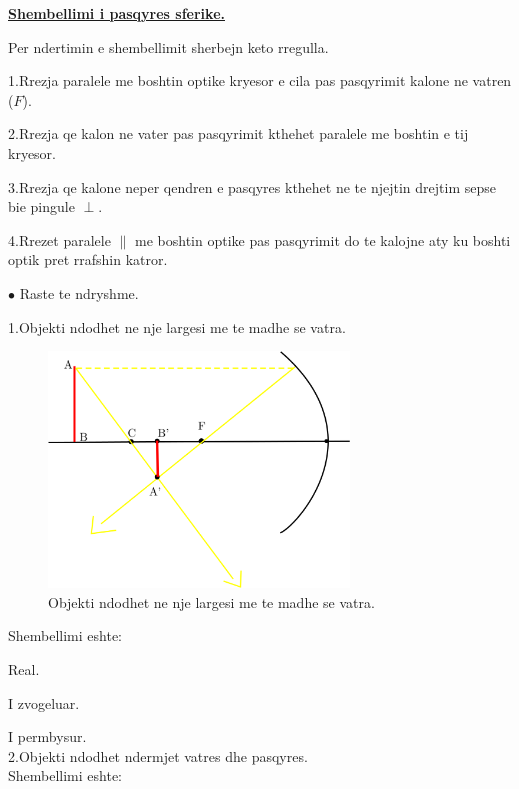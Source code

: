 \documentclass[twocolumn]{article}
\begin{document}
\begin{center}
	\textbf{\underline{Shembellimi i pasqyres sferike.}}
\end{center}

Per ndertimin e shembellimit sherbejn keto rregulla.

1.Rrezja paralele me boshtin optike kryesor e cila pas pasqyrimit kalone ne vatren ($F$).

2.Rrezja qe kalon ne vater pas pasqyrimit kthehet paralele me boshtin e tij kryesor.

3.Rrezja qe kalone neper qendren e pasqyres kthehet ne te njejtin drejtim sepse bie pingule $\perp$.

4.Rrezet paralele $\parallel$ me boshtin optike pas pasqyrimit do te kalojne aty ku boshti optik pret rrafshin katror.

\begin{center}
	$\bullet$ Raste te ndryshme.\\
\end{center}


1.Objekti ndodhet ne nje largesi me te madhe se vatra.

 \begin{figure}[h]
	\includegraphics[width=80mm]{Imazhet/Objekti_ndodhet_ne_nje_largesi_me_te_madhe_se_vatra.png}
	\caption{Objekti ndodhet ne nje largesi me te madhe se vatra.}
	\label{fig:boat1}
\end{figure}

Shembellimi eshte:

Real.

I zvogeluar.

I permbysur.\\



2.Objekti ndodhet ndermjet vatres dhe pasqyres.\\


Shembellimi eshte:
\end{document}
